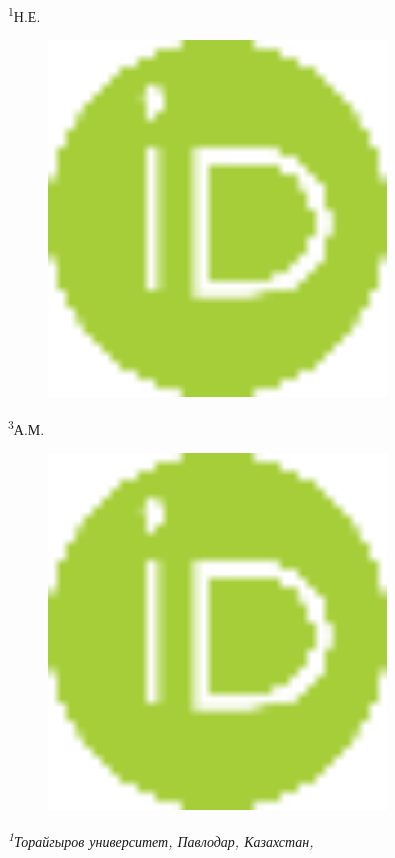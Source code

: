 {{\textsuperscript{1}Н.Е.
\begin{figure}[H]
	\centering
	\includegraphics[width=0.8\textwidth]{media/pish2/image9}
	\caption*{}
\end{figure}

\textsuperscript{3}А.М.
\begin{figure}[H]
	\centering
	\includegraphics[width=0.8\textwidth]{media/pish2/image9}
	\caption*{}
\end{figure}


\emph{\textsuperscript{1}Торайгыров университет, Павлодар, Казахстан,}

}}
